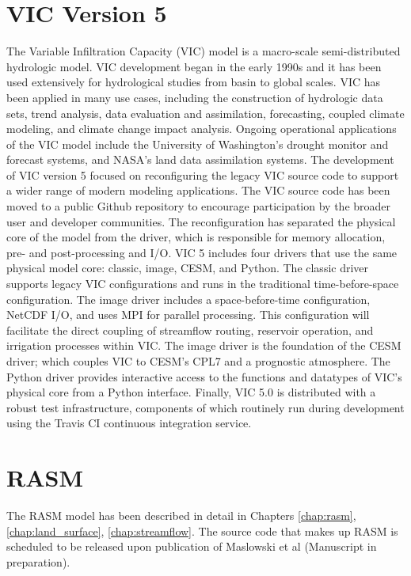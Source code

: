 \section{VIC Version 5}
\label{sec:vic_dev}
The Variable Infiltration Capacity (VIC) model is a macro-scale semi-distributed hydrologic model.
VIC development began in the early 1990s and it has been used extensively for hydrological studies from basin to global scales.
VIC has been applied in many use cases, including the construction of hydrologic data sets, trend analysis, data evaluation and assimilation, forecasting, coupled climate modeling, and climate change impact analysis.
Ongoing operational applications of the VIC model include the University of Washington's drought monitor and forecast systems, and NASA's land data assimilation systems.
The development of VIC version 5 focused on reconfiguring the legacy VIC source code to support a wider range of modern modeling applications.
The VIC source code has been moved to a public Github repository to encourage participation by the broader user and developer communities.
The reconfiguration has separated the physical core of the model from the driver, which is responsible for memory allocation, pre- and post-processing and I/O.
VIC 5 includes four drivers that use the same physical model core: classic, image, CESM, and Python.
The classic driver supports legacy VIC configurations and runs in the traditional time-before-space configuration.
The image driver includes a space-before-time configuration, NetCDF I/O, and uses MPI for parallel processing.
This configuration will facilitate the direct coupling of streamflow routing, reservoir operation, and irrigation processes within VIC.
The image driver is the foundation of the CESM driver; which couples VIC to CESM's CPL7 and a prognostic atmosphere.
The Python driver provides interactive access to the functions and datatypes of VIC's physical core from a Python interface.
Finally, VIC 5.0 is distributed with a robust test infrastructure, components of which routinely run during development using the Travis CI continuous integration service.

\section{RASM}
\label{sec:rasm_dev}

The RASM model has been described in detail in Chapters \ref{chap:rasm}, \ref{chap:land_surface}, \ref{chap:streamflow}.
The source code that makes up RASM is scheduled to be released upon publication of Maslowski et al (Manuscript in preparation).

